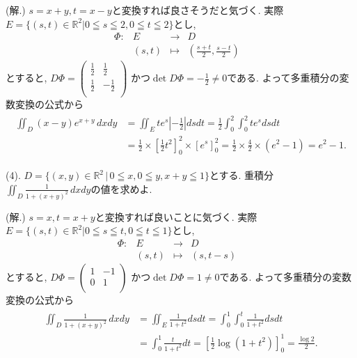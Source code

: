 \documentclass[dvipdfmx,a4paper,11pt]{article}
\newcommand{\R}{\mathbb{R}}
\theoremstyle{definition}
\begin{document}
\hspace{-11pt}(解.) $s = x+y, t=x-y$と変換すれば良さそうだと気づく. 実際$E= \{ (s,t) \in \R^2  | 0 \leqq s \leqq 2 , 
0 \leqq t \leqq 2 \}$とし, 
 $$
\begin{array}{ccccc}
\Phi: &E & \rightarrow & D & \\
&(s,t) & \longmapsto & (\frac{s+t}{2} , \frac{s-t}{2})&
\end{array}
$$
とすると,
$D\Phi=
\left(\begin{array}{cc} \frac{1}{2} &\frac{1}{2} \\ \frac{1}{2} &-\frac{1}{2}  \\ \end{array} \right)
$
かつ$\det D\Phi = -\frac{1}{2}\neq 0$である.
よって多重積分の変数変換の公式から
\begin{align*}
\begin{split}
\iint_{D} (x-y)e^{x+y}\,dxdy
&=
\iint_{E}  te^s \left|-\frac{1}{2}\right|dsdt
= \frac{1}{2}\int_{0}^{2} 
 \int_{0}^{2} te^s dsdt \\
&=
\frac{1}{2} \times  \left[\frac{1}{2}t^2 \right]^{2}_{0} \times  \left[e^s \right]^{2}_{0} 
=\frac{1}{2} \times \frac{4}{2} \times (e^2 - 1)
=e^2 - 1.
    \end{split}
  \end{align*}
\vspace{7pt}

{\large(4). $D=\{ (x,y) \in \R^2 \,|\, 0 \leqq x, 0 \leqq y,  x+y \leqq 1\}$とする.
重積分$\iint_{D} \frac{1}{1 + (x+y)^2}\,dxdy$の値を求めよ.}\vspace{7pt}

\hspace{-11pt}(解.) $s = x, t=x+y$と変換すれば良いことに気づく. 実際
$E= \{ (s,t) \in \R^2  |  0 \leqq s \leqq t, 0 \leqq t \leqq 1 \}$とし, 
 $$
\begin{array}{ccccc}
\Phi: &E & \rightarrow & D & \\
&(s,t) & \longmapsto & (s , t-s)&
\end{array}
$$
とすると,
$D\Phi=
\left(\begin{array}{cc} 1 &-1\\ 0&1 \\ \end{array} \right)
$
かつ$\det D\Phi = 1\neq 0$である.
よって多重積分の変数変換の公式から
\begin{align*}
\begin{split}
\iint_{D} \frac{1}{1 + (x+y)^2}\,dxdy
&=
\iint_{E}  \frac{1}{1 + t^2}dsdt
= \int_{0}^{1} \int_{0}^{t}  \frac{1}{1 + t^2}dsdt \\
&= \int_{0}^{1} \frac{t}{1 + t^2} dt
=\left[ \frac{1}{2}\log(1 + t^2)\right]_{0}^{1} 
=  \frac{\log 2}{2}.
    \end{split}
  \end{align*}
\vspace{7pt}
\end{document}
